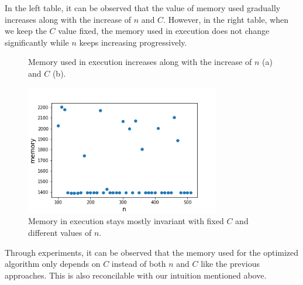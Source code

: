\documentclass{article}
\begin{document}
\indent In the left table, it can be observed that the value of memory used gradually increases along with the increase of $n$ and $C$. However, in the right table, when we keep the $C$ value fixed, the memory used in execution does not change significantly while $n$ keeps increasing progressively.
\begin{figure}[H]
\centering    
{}
\caption{Memory used in execution increases along with the increase of $n$ (a) and $C$ (b).}
\end{figure}
\begin{figure}[H]
    \centering
    \includegraphics[width=85mm]{fig3.png}
    \caption{Memory in execution stays mostly invariant with fixed $C$ and different values of $n$.}
    \label{fig:3}
\end{figure}

\indent Through experiments, it can be observed that the memory used for the optimized algorithm only depends on $C$ instead of both $n$ and $C$ like the previous approaches. This is also reconcilable with our intuition mentioned above. 
\end{document}
